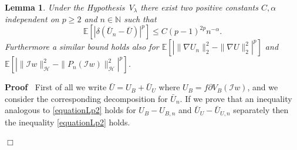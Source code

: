 \documentclass[a4paper,10pt]{article}
\newenvironment{proof}{\noindent\textbf{Proof\ }}{\hspace*{\fill}$\Box$\medskip}
\newtheorem{lemma}[theorem]{Lemma}
\begin{document}
\begin{lemma}
  \label{lemma_inequality2}Under the Hypothesis~$V_{\lambda}$ there exist two
  positive constants $C, \alpha$ independent on $p \geqslant 2$ and $n \in
  \mathbb{N}$ such that
  \begin{equation}
    \mathbb{E} [| \delta (\bar{U}_n - \bar{U}) |^p] \leqslant C (p - 1)^{2 p}
    n^{- \alpha} . \label{equationLp2}
  \end{equation}
  Furthermore a similar bound holds also for $\mathbb{E} [| \| \nabla U_n
  \|^2_2 -\| \nabla U\|^2_2 |^p]$ and $\mathbb{E} [| \|
  \mathcal{I}w\|^2_{\mathcal{H}} -\|P_n (\mathcal{I}w) \|^2_{\mathcal{H}}
  |^p]$.
\end{lemma}

\begin{proof}
  First of all we write $\bar{U} = U_B + \bar{U}_U$ where $U_B = f \partial
  V_B (\mathcal{I}w)$, and we consider the corresponding decomposition for
  $\bar{U}_n$. If we prove that an inequality analogous to
  {\eqref{equationLp2}} holds for $U_B - U_{B, n}$ and $\bar{U}_U -
  \bar{U}_{U, n}$ separately then the inequality {\eqref{equationLp2}} holds.
  

\end{proof}
\end{document}
